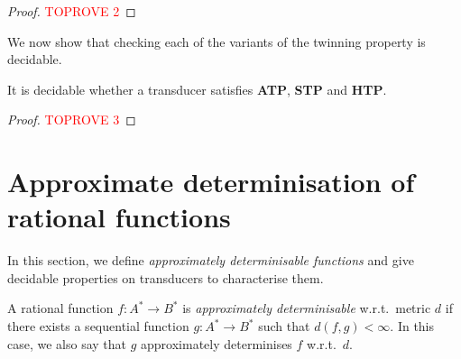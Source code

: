 \documentclass[a4paper,UKenglish,cleveref, autoref, thm-restate,authorcolumns, colorlinks]{lipics-v2021}
\newcommand{\ATP}[0]{\textbf{ATP}}
\newcommand{\STP}[0]{\textbf{STP}}
\newcommand{\HTP}[0]{\textbf{HTP}}
\begin{document}
\begin{proof}\textcolor{red}{TOPROVE 2}\end{proof}

We now show that checking each of the variants of the twinning property is decidable.
\begin{lemma}\label{lem:decideTPs}
    It is decidable whether a transducer satisfies \ATP{}, \STP{} and \HTP{}.
\end{lemma}

\begin{proof}\textcolor{red}{TOPROVE 3}\end{proof}
     

\section{Approximate determinisation of rational functions}

In this section, we define \emph{approximately determinisable functions} and give decidable properties on transducers to characterise them.

\begin{definition}\label{def:approxdeter}
A rational function $f : A^\ast \rightarrow B^\ast$ is \emph{approximately determinisable} w.r.t.~metric $d$ if there exists a sequential function $g : A^\ast \rightarrow B^\ast$ such that $d(f,g) < \infty$. In this case, we also say that $g$ approximately determinises $f$ w.r.t.~$d$. 
\end{definition}
\end{document}
